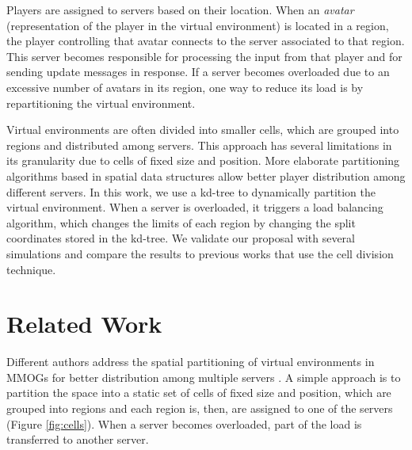 \documentclass[acmjacm]{acmtrans2m}
\newcommand{\figurecaption}{Figure}
\begin{document}
Players are assigned to servers based on their location. When an \emph{avatar} (representation of the player in the virtual environment) is located in a region, the player controlling that avatar connects to the server associated to that region. This server becomes responsible for processing the input from that player and for sending update messages in response. If a server becomes overloaded due to an excessive number of avatars in its region, one way to reduce its load is by repartitioning the virtual environment.%

Virtual environments are often divided into smaller cells, which are grouped into regions and distributed among servers. This approach has several limitations in its granularity due to cells of fixed size and position. More elaborate partitioning algorithms based in spatial data structures \cite{samet2005} allow better player distribution among different servers. In this work, we use a kd-tree to dynamically partition the virtual environment. When a server is overloaded, it triggers a load balancing algorithm, which changes the limits of each region by changing the split coordinates stored in the kd-tree. We validate our proposal with several simulations and compare the results to previous works that use the cell division technique.

%

\section{Related Work}
\label{context}

Different authors address the spatial partitioning of virtual environments in MMOGs for better distribution among multiple servers \cite{ahmed2008mol,bezerra2009lbs}. A simple approach is to partition the space into a static set of cells of fixed size and position, which are grouped into regions and each region is, then, are assigned to one of the servers (\figurecaption{} \ref{fig:cells}). When a server becomes overloaded, part of the load is transferred to another server.
\end{document}
